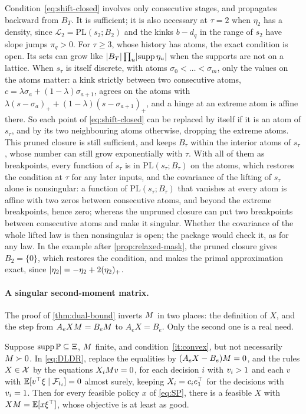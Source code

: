 Condition~\eqref{eq:shift-closed} involves only consecutive stages, and propagates backward from $B_T$.
It is sufficient; it is also necessary at $\tau = 2$ when $\eta_2$ has a density, since $\mathcal L_2 = \mathrm{PL}(s_2; B_2)$ and the kinks $b - d_q$ in the range of $s_2$ have slope jumps $\pi_q > 0$.
For $\tau \ge 3$, whose history has atoms, the exact condition is open.
Its sets can grow like $\lvert B_T \rvert\prod_u\lvert \operatorname{supp}\eta_u \rvert$ when the supports are not on a lattice.
When $s_\tau$ is itself discrete, with atoms $\sigma_0 < \dots < \sigma_m$, only the values on the atoms matter:
a kink strictly between two consecutive atoms, $c = \lambda\sigma_a + (1 - \lambda)\sigma_{a+1}$, agrees on the atoms with $\lambda(s - \sigma_a)_+ + (1 - \lambda)(s - \sigma_{a+1})_+$, and a hinge at an extreme atom is affine there.
So each point of \eqref{eq:shift-closed} can be replaced by itself if it is an atom of $s_\tau$, and by its two neighbouring atoms otherwise, dropping the extreme atoms.
This pruned closure is still sufficient, and keeps $B_\tau$ within the interior atoms of $s_\tau$, whose number can still grow exponentially with $\tau$.
With all of them as breakpoints, every function of $s_\tau$ is in $\mathrm{PL}(s_\tau; B_\tau)$ on the atoms, which restores the condition at $\tau$ for any later inputs,
and the covariance of the lifting of $s_\tau$ alone is nonsingular:
a function of $\mathrm{PL}(s_\tau; B_\tau)$ that vanishes at every atom is affine with two zeros between consecutive atoms, and beyond the extreme breakpoints, hence zero;
whereas the unpruned closure can put two breakpoints between consecutive atoms and make it singular.
Whether the covariance of the whole lifted law is then nonsingular is open; the package would check it, as for any law.
In the example after \cref{prop:relaxed-mask}, the pruned closure gives $B_2 = \{0\}$, which restores the condition, and makes the primal approximation exact, since $\lvert \eta_2 \rvert = -\eta_2 + 2(\eta_2)_+$.

\paragraph{A singular second-moment matrix.}
The proof of \cref{thm:dual-bound} inverts $M$ in two places: the definition of $X$, and the step from $A_eXM = B_eM$ to $A_eX = B_e$.
Only the second one is a real need.

\begin{proposition}
\label{prop:singular-moments}
Suppose $\operatorname{supp}\mathbb{P} \subseteq \Xi$, $M$ finite, and condition~\ref{it:convex}, but not necessarily $M \succ 0$.
In \eqref{eq:DLDR}, replace the equalities by $(A_eX - B_e)M = 0$, and the rules $X \in \mathcal{X}$ by the equations $X_iM v = 0$, for each decision $i$ with $v_i > 1$ and each $v$ with $\mathbb{E}[v^\top\xi \mid \mathcal F_{t_i}] = 0$ almost surely, keeping $X_i = c_ie_1^\top$ for the decisions with $v_i = 1$.
Then for every feasible policy $x$ of \eqref{eq:SP}, there is a feasible $X$ with $XM = \mathbb{E}[x\xi^\top]$, whose objective is at least as good.
\end{proposition}

